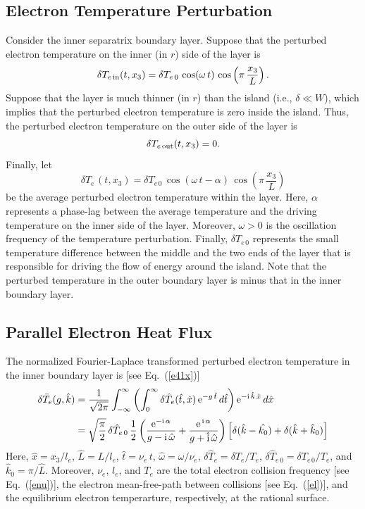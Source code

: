 \documentclass[12pt,prb,aps]{revtex4-1}
\begin{document}
\subsection{Electron Temperature Perturbation}
Consider the inner separatrix boundary layer. Suppose that the perturbed electron temperature on the inner (in $r$) side of the layer is
\begin{equation}
\delta T_{e\,{\rm in}}(t,x_3) =\delta T_{e\,0}\,\cos(\omega \,t)\,\cos\left(\pi\,\frac{x_3}{L}\right).
\end{equation}
Suppose that the layer is much thinner (in $r$) than the island (i.e., $\delta\ll W$), which implies that the perturbed electron temperature is zero inside the island. Thus, the perturbed electron
temperature on the outer side of the layer is 
\begin{equation}
\delta T_{e\,{\rm out}}(t,x_3) =0.
\end{equation}
Finally, let 
\begin{equation}
\delta T_{e\,}(t,x_3) =\delta T_{e\,0}\,\cos(\omega \,t-\alpha)\,\cos\left(\pi\,\frac{x_3}{L}\right)
\end{equation}
be the average perturbed electron temperature within the layer. Here, $\alpha$ represents a phase-lag between the average temperature and the driving temperature on the
inner side of the layer. Moreover, $\omega>0$ is the oscillation frequency of the temperature perturbation. Finally, $\delta T_{e\,0}$ represents the small temperature difference 
between the middle  and the two ends of the layer that is responsible for driving the flow of energy around the island. Note that the perturbed temperature in the outer boundary layer is
minus that in the inner boundary layer. 

\subsection{Parallel Electron Heat Flux}
The normalized Fourier-Laplace transformed perturbed electron temperature in the inner boundary layer is [see Eq.~(\ref{e41x})]
\begin{align}
\delta\bar{T}_e(g,\hat{k}) &= \frac{1}{\sqrt{2\pi}}\int_{-\infty}^\infty \left(\int_0^\infty \delta \hat{T}_e(\hat{t},\hat{x})\,{\rm e}^{-g\,\hat{t}}\,d\hat{t}\right){\rm e}^{-{\rm i}\,\hat{k}\,\hat{x}}\,d\hat{x}
\nonumber\\[0.5ex]
&=\sqrt{\frac{\pi}{2}}\, \delta\hat{T}_{e\,0}\,\frac{1}{2}\left(
\frac{{\rm e}^{-{\rm i}\,\alpha}}{g-{\rm i}\,\hat{\omega}}+ \frac{{\rm e}^{\,{\rm i}\,\alpha}}{g+\hat{\rm i}\,\hat{\omega}}\right)\left[\delta (\hat{k}-\hat{k_0})+ \delta(\hat{k}+\hat{k}_0)\right]
\end{align}
Here, $\hat{x}=x_3/l_e$, $\hat{L}=L/l_e$, $\hat{t}=\nu_e\,t$, $\hat{\omega}=\omega/\nu_e$, $\delta \hat{T}_e = \delta T_e/T_e$, $\delta \hat{T}_{e\,0} = \delta T_{e\,0}/T_e$, and
$\hat{k}_0=\pi/\hat{L}$. Moreover, $\nu_e$, $l_e$, and $T_e$ are the total electron collision frequency [see Eq.~(\ref{enu})], the electron mean-free-path between collisions [see Eq.~(\ref{el})], and the equilibrium electron temperarture,
respectively, at the rational surface. 
\end{document}
